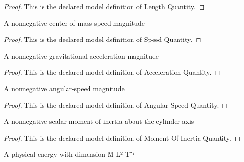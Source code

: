 \begin{proof}
  This is the declared model definition of Length Quantity.
\end{proof}
\begin{definition}
  \label{def:physics:phyx-mini-0824:phyxminiproblems-problemphyxmini0824-speedquantity}
  A nonnegative center-of-mass speed magnitude
\end{definition}
\begin{proof}
  This is the declared model definition of Speed Quantity.
\end{proof}
\begin{definition}
  \label{def:physics:phyx-mini-0824:phyxminiproblems-problemphyxmini0824-accelerationquantity}
  A nonnegative gravitational-acceleration magnitude
\end{definition}
\begin{proof}
  This is the declared model definition of Acceleration Quantity.
\end{proof}
\begin{definition}
  \label{def:physics:phyx-mini-0824:phyxminiproblems-problemphyxmini0824-angularspeedquantity}
  A nonnegative angular-speed magnitude
\end{definition}
\begin{proof}
  This is the declared model definition of Angular Speed Quantity.
\end{proof}
\begin{definition}
  \label{def:physics:phyx-mini-0824:phyxminiproblems-problemphyxmini0824-momentofinertiaquantity}
  A nonnegative scalar moment of inertia about the cylinder axis
\end{definition}
\begin{proof}
  This is the declared model definition of Moment Of Inertia Quantity.
\end{proof}
\begin{definition}
  \label{def:physics:phyx-mini-0824:phyxminiproblems-problemphyxmini0824-energyquantity}
  A physical energy with dimension M L² T⁻²
\end{definition}
